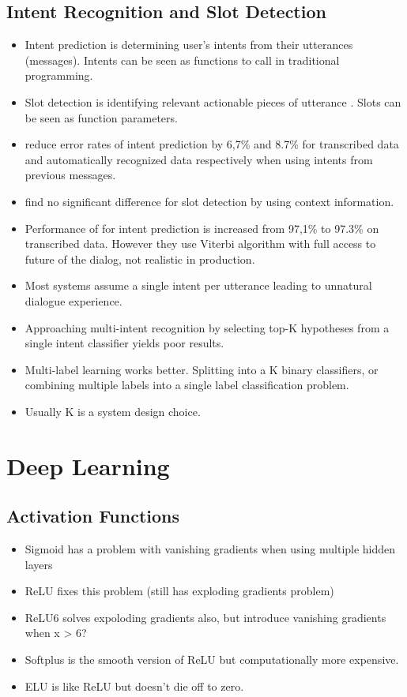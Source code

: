 \documentclass[12pt,a4paper,english
]{tutthesis}
\begin{document}
\section{Intent Recognition and Slot Detection}
\label{se:intetn_prediction_and_slot_detection}
\begin{itemize}
\item Intent prediction is determining user's intents from their utterances (messages). Intents can be seen as functions to call in traditional programming.
\item Slot detection is identifying relevant actionable pieces of utterance \cite{Bhargava2013}. Slots can be seen as function parameters.
\item \cite{Bhargava2013} reduce error rates of intent prediction by 6,7\% and 8.7\% for transcribed data and automatically recognized data respectively when using intents from previous messages.
\item \cite{Bhargava2013} find no significant difference for slot detection by using context information.
\item Performance of \cite{Bhargava2013} for intent prediction is increased from 97,1\% to 97.3\% on transcribed data. However they use Viterbi algorithm with full access to future of the dialog, not realistic in production.
\item Most systems assume a single intent per utterance leading to unnatural dialogue experience. \cite{Xu2013}
\item Approaching multi-intent recognition by selecting top-K hypotheses from a single intent classifier yields poor results. \cite{Xu2013}
\item Multi-label learning works better. Splitting into a K binary classifiers, or combining multiple labels into a single label classification problem. \cite{Xu2013}
\item Usually K is a system design choice. \cite{Xu2013}
\end{itemize}


\chapter{Deep Learning}
\label{ch:deep_learning}

\section{Activation Functions}
\begin{itemize}
\item Sigmoid has a problem with vanishing gradients when using multiple hidden layers
\item ReLU fixes this problem (still has exploding gradients problem)
\item ReLU6 solves expoloding gradients also, but introduce vanishing gradients when x > 6?
\item Softplus is the smooth version of ReLU but computationally more expensive.
\item ELU is like ReLU but doesn't die off to zero. \cite{Clevert2015}
\end{itemize}
\end{document}
